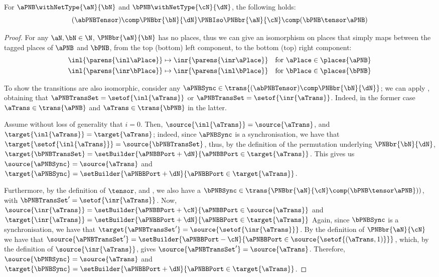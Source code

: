 \begin{proposition}\label{prop:braidingNatural}
    For $\aPNB \withNetType{\aN}{\bN}$ and $\bPNB \withNetType{\cN}{\dN}$, the
    following holds:
    \[
        (\abPNBTensor) \comp \PNBbr{\bN}{\dN}
        \PNBIso
        \PNBbr{\aN}{\cN} \comp (\bPNB \tensor \aPNB)
    \]
\end{proposition}
\begin{proof}
    For any $\aN, \bN \in \N$, $\PNBbr{\aN}{\bN}$ has no places, thus we can
    give an isomorphism on places that simply maps between the tagged
    places of $\aPNB$ and $\bPNB$, from the top (bottom) left component, to the
    bottom (top) right component:
    \begin{align*}
        \inl{\parens{\inl \aPlace}} &\mapsto \inr{\parens{\inr \aPlace}} \quad \text{for } \aPlace \in \places{\aPNB}\\
        \inl{\parens{\inr \bPlace}} &\mapsto \inr{\parens{\inl \bPlace}} \quad \text{for } \bPlace \in \places{\bPNB}
    \end{align*}

    To show the transitions are also isomorphic, consider any $\aPNBSync \in \trans{(\abPNBTensor)
    \comp \PNBbr{\bN}{\dN}}$; we can apply , obtaining that
    $\aPNBTransSet = \setof{\inl{\aTrans}}$ or $\aPNBTransSet = \setof{\inr{\aTrans}}$. Indeed, in
    the former case $\aTrans \in \trans{\aPNB}$ and $\aTrans \in \trans{\bPNB}$ in the latter.

    Assume without loss of generality that $i = 0$.
    Then, $\source{\inl{\aTrans}} = \source{\aTrans}$, and
    $\target{\inl{\aTrans}} = \target{\aTrans}$; indeed, since $\aPNBSync$
    is a synchronisation, we have that $\target{\setof{\inl{\aTrans}}} =
    \source{\bPNBTransSet}$, thus, by the definition of the permutation
    underlying $\PNBbr{\bN}{\dN}$, $\target{\bPNBTransSet} =
    \setBuilder{\aPNBBPort + \dN}{\aPNBBPort \in \target{\aTrans}}$. This
    gives us $\source{\aPNBSync} = \source{\aTrans}$ and $\target{\aPNBSync}
    =  \setBuilder{\aPNBBPort + \dN}{\aPNBBPort \in \target{\aTrans}}$.

    Furthermore, by the definition of $\tensor$, and
    , we also have a $\bPNBSync \in
    \trans{\PNBbr{\aN}{\cN} \comp (\bPNB \tensor \aPNB}))$, with
    $\bPNBTransSet' = \setof{\inr{\aTrans}}$. Now, $\source{\inr{\aTrans}}
    = \setBuilder{\aPNBBPort + \cN}{\aPNBBPort \in \source{\aTrans}}$ and
    $\target{\inr{\aTrans}} = \setBuilder{\aPNBBPort + \dN}{\aPNBBPort \in
    \target{\aTrans}}$ Again, since $\bPNBSync$ is a synchronisation, we
    have that $\target{\aPNBTransSet'} = \source{\setof{\inr{\aTrans}}}$. By
    the definition of $\PNBbr{\aN}{\cN}$ we have that $\source{\aPNBTransSet'}
    = \setBuilder{\aPNBBPort - \cN}{\aPNBBPort \in \source{\setof{(\aTrans,
    1)}}}$, which, by the definition of $\source{\inr{\aTrans}}$, gives
    $\source{\aPNBTransSet'} = \source{\aTrans}$. Therefore,
    $\source{\bPNBSync} = \source{\aTrans}$ and $\target{\bPNBSync} =
    \setBuilder{\aPNBBPort + \dN}{\aPNBBPort \in \target{\aTrans}}$.


\end{proof}
